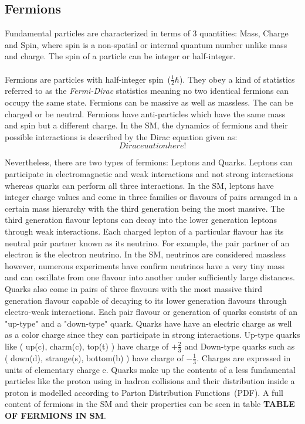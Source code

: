 \subsection*{Fermions}
Fundamental particles are characterized in terms of 3 quantities: Mass, Charge and Spin, where spin is a non-spatial or internal quantum number unlike mass and charge. The spin of a particle can be integer or half-integer.
\paragraph*{}
Fermions are particles with half-integer spin~($\frac{1}{2} \hbar$). They obey a kind of statistics referred to as the \textit{Fermi-Dirac} statistics meaning no two identical fermions can occupy the same state. Fermions can be massive as well as massless. The can be charged or be neutral. Fermions have anti-particles which have the same mass and spin but a different charge.
\newline
In the SM, the dynamics of fermions and their possible interactions is described by the Dirac equation given as:
\begin{equation}
 Dirac euation here!
\end{equation}

Nevertheless, there are two types of fermions: Leptons and Quarks.
\newline
Leptons can participate in electromagnetic and weak interactions and not strong interactions whereas quarks can perform all three interactions. In the SM, leptons have integer charge values and come in three families or flavours of pairs arranged in a certain mass hierarchy with the third generation being the most massive. The third generation flavour leptons can decay into the lower generation leptons through weak interactions. Each charged lepton of a particular flavour has its neutral pair partner known as its neutrino. For example, the pair partner of an electron is the electron neutrino. In the SM, neutrinos are considered massless however, numerous experiments have confirm neutrinos have a very tiny mass and can oscillate from one flavour into another under sufficiently large distances.
\newline
Quarks also come in pairs of three flavours with the most massive third generation flavour capable of decaying to its lower generation flavours through electro-weak interactions. Each pair flavour or generation of quarks consists of an "up-type" and a "down-type" quark. Quarks have have an electric charge as well as a color charge since they can participate in strong interactions. Up-type quarks like ( up(c), charm(c), top(t) ) have charge of $+\frac{2}{3}$ and Down-type quarks such as ( down(d), strange(s), bottom(b) ) have charge of $-\frac{1}{3}$. Charges are expressed in units of elementary charge e.
Quarks make up the contents of a less fundamental particles like the proton using in hadron collisions and their distribution inside a proton is modelled according to Parton Distribution Functions~(PDF). 
A full content of fermions in the SM and their properties can be seen in table \textbf{TABLE OF FERMIONS IN SM}.

